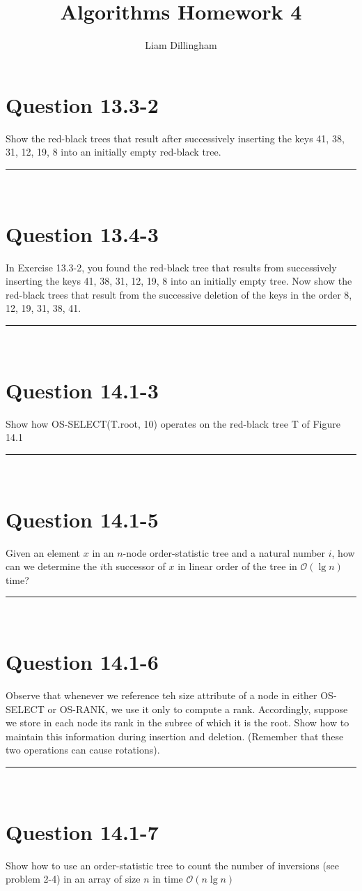 \documentclass[20pt]{article} %
\title{Algorithms Homework 4}
\author{Liam Dillingham}
\begin{document}
\maketitle

\section{Question 13.3-2} 
Show the red-black trees that result after successively inserting the keys 41, 38, 31, 12, 19, 8 into an initially empty red-black tree. \\
\noindent\rule{2cm}{0.4pt} \\


\section{Question 13.4-3}
In Exercise 13.3-2, you found the red-black tree that results from successively inserting the keys 41, 38, 31, 12, 19, 8 into an initially empty tree. Now show the red-black trees that result from the successive deletion of the keys in the order 8, 12, 19, 31, 38, 41. \\
\noindent\rule{2cm}{0.4pt} \\


\section{Question 14.1-3}
Show how OS-SELECT(T.root, 10) operates on the red-black tree T of Figure 14.1 \\
\noindent\rule{2cm}{0.4pt} \\

\section{Question 14.1-5}
Given an element $x$ in an $n$-node order-statistic tree and a natural number $i$, how can we determine the $i$th successor of $x$ in linear order of the tree in $\mathcal{O}(\lg n)$ time? \\
\noindent\rule{2cm}{0.4pt} \\


\section{Question 14.1-6}
Observe that whenever we reference teh size attribute of a node in either OS-SELECT or OS-RANK, we use it only to compute a rank.  Accordingly, suppose we store in each node its rank in the subree of which it is the root. Show how to maintain this information during insertion and deletion. (Remember that these two operations can cause rotations). \\
\noindent\rule{2cm}{0.4pt} \\


\section{Question 14.1-7}
Show how to use an order-statistic tree to count the number of inversions (see problem 2-4) in an array of size $n$ in time $\mathcal{O}(n \lg n)$ 
\end{document}
